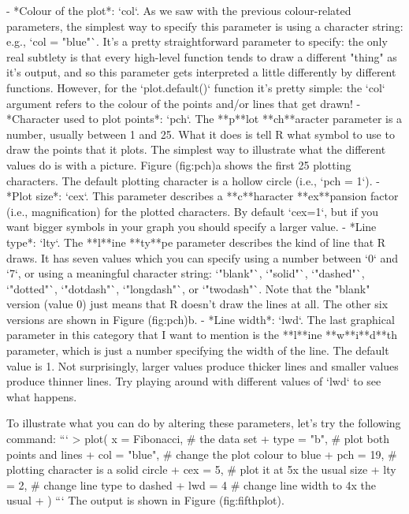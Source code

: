 - *Colour of the plot*: `col`. As we saw with the previous colour-related parameters, the simplest way to specify this parameter is using a character string: e.g., `col = "blue"`. It's a pretty straightforward parameter to specify: the only real subtlety is that every high-level function tends to draw a different "thing" as it's output, and so this parameter gets interpreted a little differently by different functions. However, for the `plot.default()` function it's pretty simple: the `col` argument refers to the colour of the points and/or lines that get drawn! 
- *Character used to plot points*: `pch`. The **p**lot **ch**aracter parameter is a number, usually between 1 and 25. What it does is tell R what symbol to use to draw the points that it plots. The simplest way to illustrate what the different values do is with a picture. Figure \@ref(fig:pch)a shows the first 25 plotting characters. The default plotting character is a hollow circle (i.e., `pch = 1`).
- *Plot size*: `cex`. This parameter describes a **c**haracter **ex**pansion factor (i.e., magnification) for the plotted characters. By default `cex=1`, but if you want bigger symbols in your graph you should specify a larger value.
- *Line type*: `lty`. The **l**ine **ty**pe parameter describes the kind of line that R draws. It has seven values which you can specify using a number between `0` and `7`, or using a meaningful character string: `"blank"`, `"solid"`, `"dashed"`, `"dotted"`, `"dotdash"`, `"longdash"`, or `"twodash"`. Note that the "blank" version (value 0) just means that R doesn't draw the lines at all. The other six versions are shown in Figure \@ref(fig:pch)b.
- *Line width*: `lwd`. The last graphical parameter in this category that I want to mention is the **l**ine **w**i**d**th parameter, which is just a number specifying the width of the line. The default value is 1. Not surprisingly, larger values produce thicker lines and smaller values produce thinner lines. Try playing around with different values of `lwd` to see what happens.

To illustrate what you can do by altering these parameters, let's try the following command:
```
> plot( x = Fibonacci,   # the data set
+       type = "b",      # plot both points and lines
+       col = "blue",    # change the plot colour to blue
+       pch = 19,        # plotting character is a solid circle
+       cex = 5,         # plot it at 5x the usual size
+       lty = 2,         # change line type to dashed
+       lwd = 4          # change line width to 4x the usual
+ )
```
The output is shown in Figure \@ref(fig:fifthplot).


